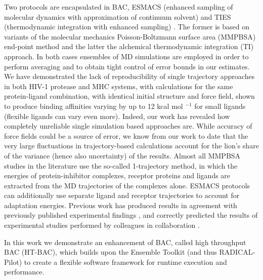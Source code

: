 Two protocols are encapsulated in BAC, ESMACS (enhanced sampling of molecular dynamics with approximation of continuum solvent) \cite{Wan2017brd4} and TIES (thermodynamic integration with enhanced sampling) \cite{Bhati2017}.
The former is based on variants of the molecular mechanics Poisson-Boltzmann surface area (MMPBSA) end-point method and the latter the alchemical thermodynamic integration (TI) approach.
In both cases ensembles of MD simulations are employed in order to perform averaging and to obtain tight control of error bounds in our estimates.
We have demonstrated the lack of reproducibility of single trajectory approaches in both HIV-1 protease and MHC systems, with calculations for the same protein-ligand combination, with identical initial structure and force field, shown to produce binding affinities varying by up to 12 kcal mol $^{-1}$ for small ligands (flexible ligands can vary even more). \cite{Wan2015, Sadiq2010, Wright2014}
Indeed, our work has revealed how completely unreliable single simulation based approaches are. 
While accuracy of force fields could be a source of error, we know from our work to date \cite{} that the very large fluctuations in trajectory-based calculations account for the lion’s share of the variance (hence also uncertainty) of the results.
Almost all MMPBSA studies in the literature use the so-called 1-trajectory method, in which the energies of protein-inhibitor complexes, receptor proteins and ligands are extracted from the MD trajectories of the complexes alone. 
ESMACS protocols can additionally use  separate ligand and receptor trajectories to account for adaptation energies. 
Previous work has produced results in agreement with previously published experimental findings \cite{Sadiq2010, Wan2011, Wright2014, Bhati2017, Wan2017brd4, Wan2017trk}, and correctly predicted the results of experimental studies performed by colleagues in collaboration \cite{Bunney2015}.

In this work we demonstrate an enhancement of BAC, called high throughput BAC (HT-BAC), which builds upon the Ensemble Toolkit (and thus RADICAL-Pilot) to create a flexible software framework for runtime execution and performance.
